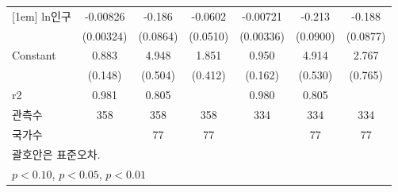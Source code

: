 \begin{table}[htbp]
{\begin{tabular}{l*{6}{c}}
[1em]
ln인구            &    -0.00826\sym{**} &      -0.186\sym{**} &     -0.0602         &    -0.00721\sym{**} &      -0.213\sym{**} &      -0.188\sym{**} \\
                    &   (0.00324)         &    (0.0864)         &    (0.0510)         &   (0.00336)         &    (0.0900)         &    (0.0877)         \\
[1em]
Constant            &       0.883\sym{***}&       4.948\sym{***}&       1.851\sym{***}&       0.950\sym{***}&       4.914\sym{***}&       2.767\sym{***}\\
                    &     (0.148)         &     (0.504)         &     (0.412)         &     (0.162)         &     (0.530)         &     (0.765)         \\
\hline
r2                  &       0.981         &       0.805         &                     &       0.980         &       0.805         &                     \\
관측수                   &         358         &         358         &         358         &         334         &         334         &         334         \\
국가수                 &                     &          77         &          77         &                     &          77         &          77         \\
\hline\hline
\multicolumn{7}{l}{\footnotesize  괄호안은 표준오차.}\\
\multicolumn{7}{l}{\footnotesize \sym{*} \(p<0.10\), \sym{**} \(p<0.05\), \sym{***} \(p<0.01\)}\\
\end{tabular}}
\end{table}